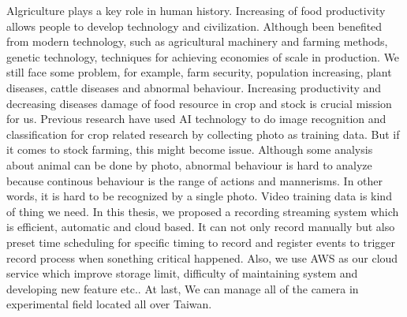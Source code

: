 \begin{abstracten}
\setcounter{page}{1}
Algriculture plays a key role in human history. Increasing of food productivity allows people to develop technology and civilization. Although been benefited from modern technology, such as agricultural machinery and farming methods, genetic technology, techniques for achieving economies of scale in production. We still face some problem, for example, farm security, population increasing, plant diseases, cattle diseases and abnormal behaviour. Increasing productivity and decreasing diseases damage of food resource in crop and stock is crucial mission for us. Previous research have used AI technology to do image recognition and classification for crop related research by collecting photo as training data. But if it comes to stock farming, this might become issue. Although some analysis about animal can be done by photo, abnormal behaviour is hard to analyze because continous behaviour is the range of actions and mannerisms. In other words, it is hard to be recognized by a single photo. Video training data is kind of thing we need. In this thesis, we proposed a recording streaming system which is efficient, automatic and cloud based. It can not only record manually but also preset time scheduling for specific timing to record and register events to trigger record process when sonething critical happened. Also, we use AWS as our cloud service which improve storage limit, difficulty of maintaining system and developing new feature etc.. At last, We can manage all of the camera in experimental field located all over Taiwan.
\end{abstracten}

